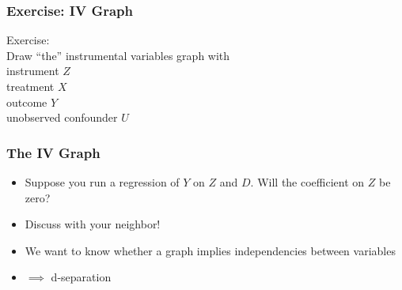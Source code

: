\documentclass{beamer}
\begin{document}
\begin{frame}[t]
\frametitle{Exercise: IV Graph}
\color{blue}
	\huge
	 \begin{center}
 Exercise:
 \\

Draw ``the'' instrumental variables graph with \\
instrument $Z$ \\
 treatment $X$ \\
  outcome $Y$ \\
   unobserved confounder $U$
\end{center} 
\end{frame}

\begin{frame}[t]
\frametitle{The IV Graph}
\begin{figure}

	\centering
{}
\end{figure}
\begin{itemize}
	\item<1-> Suppose you run a regression of $Y$ on $Z$ and $D$. Will the coefficient on $Z$ be zero?
	\item<2-> Discuss with your neighbor!
	\item<3-> We want to know whether a graph implies independencies between variables
	\item<4-> $\implies$ d-separation
\end{itemize}
\end{frame}
\end{document}
